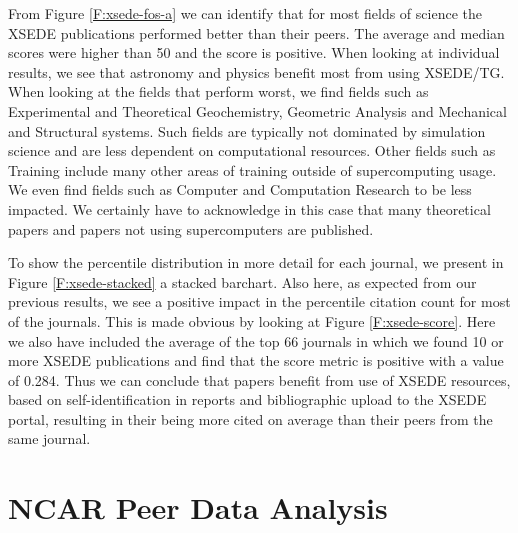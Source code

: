 \documentclass{sig-alternate}
\begin{document}
From Figure \ref{F:xsede-fos-a} we can identify that for most fields of science the XSEDE publications performed better than their peers. The average and median scores were higher than 50 and the score is positive. When looking at individual results, we see that astronomy and physics benefit most from using XSEDE/TG. When looking at the fields that perform worst, we find fields such as Experimental and Theoretical Geochemistry, Geometric Analysis and Mechanical and Structural systems. Such fields are typically not dominated by simulation science and are less dependent on computational resources. Other fields such as Training include many other areas of training outside of supercomputing usage. We even find fields such as Computer and Computation Research to be less impacted. We certainly have to acknowledge in this case that many theoretical papers and papers not using supercomputers are published. 

To show the percentile distribution in more detail for each journal, we present in Figure \ref{F:xsede-stacked} a stacked barchart. Also here, as expected from our previous results, we see a positive impact in the percentile citation count for most of the journals. This is made obvious by looking at Figure \ref{F:xsede-score}. Here we also have included the average of the top 66 journals in which we found 10 or more XSEDE publications and find that the score metric is positive with a value of 0.284. Thus we can conclude that papers benefit from use of XSEDE resources, based on self-identification in reports and bibliographic upload to the XSEDE portal, resulting in their being more cited on average than their peers from the same journal.

\section{NCAR Peer Data Analysis}\label{S:ncar}
\end{document}
